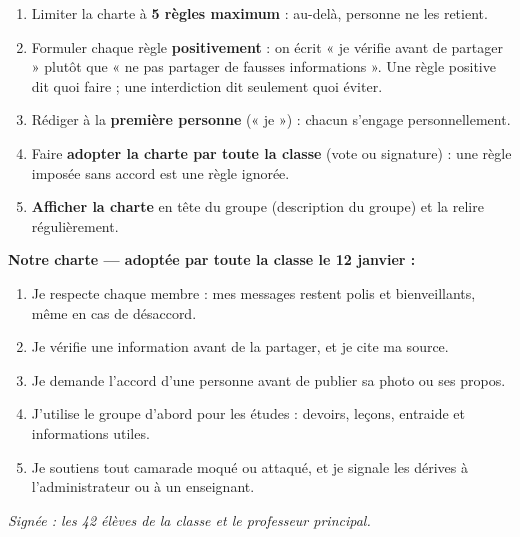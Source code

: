 \documentclass[11pt]{article}
\begin{document}
\begin{methode}
\begin{enumerate}
\item Limiter la charte à \textbf{5 règles maximum} : au-delà, personne ne les retient.
\item Formuler chaque règle \textbf{positivement} : on écrit « je vérifie avant de partager » plutôt que « ne pas partager de fausses informations ». Une règle positive dit quoi faire ; une interdiction dit seulement quoi éviter.
\item Rédiger à la \textbf{première personne} (« je ») : chacun s'engage personnellement.
\item Faire \textbf{adopter la charte par toute la classe} (vote ou signature) : une règle imposée sans accord est une règle ignorée.
\item \textbf{Afficher la charte} en tête du groupe (description du groupe) et la relire régulièrement.
\end{enumerate}
\end{methode}

\begin{exemplebox}
\textbf{Notre charte — adoptée par toute la classe le 12 janvier :}
\begin{enumerate}
\item Je respecte chaque membre : mes messages restent polis et bienveillants, même en cas de désaccord.
\item Je vérifie une information avant de la partager, et je cite ma source.
\item Je demande l'accord d'une personne avant de publier sa photo ou ses propos.
\item J'utilise le groupe d'abord pour les études : devoirs, leçons, entraide et informations utiles.
\item Je soutiens tout camarade moqué ou attaqué, et je signale les dérives à l'administrateur ou à un enseignant.
\end{enumerate}
\emph{Signée : les 42 élèves de la classe et le professeur principal.}
\end{exemplebox}
\end{document}
